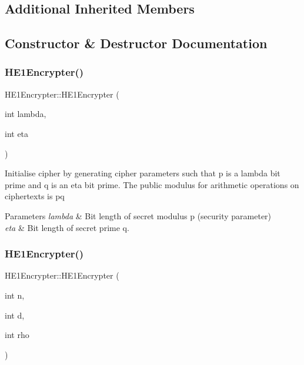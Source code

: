\subsection*{Additional Inherited Members}


\subsection{Constructor \& Destructor Documentation}
\mbox{\label{classHE1Encrypter_a4126c0700e63763f7f239876a2196f54}} 
\subsubsection{\texorpdfstring{H\+E1\+Encrypter()}{HE1Encrypter()}\hspace{0.1cm}{\footnotesize\ttfamily [1/2]}}
{\footnotesize\ttfamily H\+E1\+Encrypter\+::\+H\+E1\+Encrypter (\begin{DoxyParamCaption}\item[{int}]{lambda,  }\item[{int}]{eta }\end{DoxyParamCaption})}

Initialise cipher by generating cipher parameters such that {\ttfamily p} is a {\ttfamily lambda} bit prime and {\ttfamily q} is an {\ttfamily eta} bit prime. The public modulus for arithmetic operations on ciphertexts is {\ttfamily pq} 
\begin{DoxyParams}{Parameters}
{\em lambda} & Bit length of secret modulus {\ttfamily p} (security parameter) \\
\hline
{\em eta} & Bit length of secret prime {\ttfamily q}. \\
\hline
\end{DoxyParams}
\mbox{\label{classHE1Encrypter_a3cce07a63783a523afcf6905e2df4b93}} 
\subsubsection{\texorpdfstring{H\+E1\+Encrypter()}{HE1Encrypter()}\hspace{0.1cm}{\footnotesize\ttfamily [2/2]}}
{\footnotesize\ttfamily H\+E1\+Encrypter\+::\+H\+E1\+Encrypter (\begin{DoxyParamCaption}\item[{int}]{n,  }\item[{int}]{d,  }\item[{int}]{rho }\end{DoxyParamCaption})}

